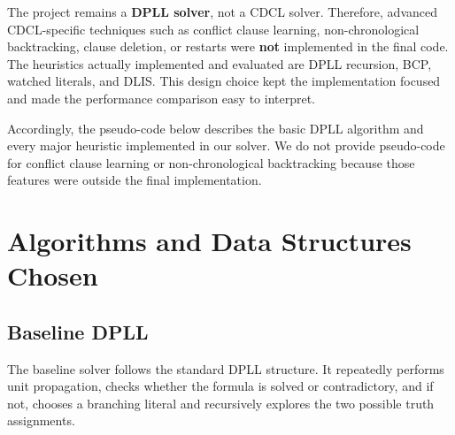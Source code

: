 \documentclass[11pt]{article}
\begin{document}
The project remains a \textbf{DPLL solver}, not a CDCL solver. Therefore,
advanced CDCL-specific techniques such as conflict clause learning,
non-chronological backtracking, clause deletion, or restarts were \textbf{not}
implemented in the final code. The heuristics actually implemented and
evaluated are DPLL recursion, BCP, watched literals, and DLIS. This design
choice kept the implementation focused and made the performance comparison easy
to interpret.

Accordingly, the pseudo-code below describes the basic DPLL algorithm and every
major heuristic implemented in our solver. We do not provide pseudo-code for
conflict clause learning or non-chronological backtracking because those
features were outside the final implementation.

\section{Algorithms and Data Structures Chosen}

\subsection{Baseline DPLL}

The baseline solver follows the standard DPLL structure. It repeatedly performs
unit propagation, checks whether the formula is solved or contradictory, and if
not, chooses a branching literal and recursively explores the two possible
truth assignments.
\end{document}
